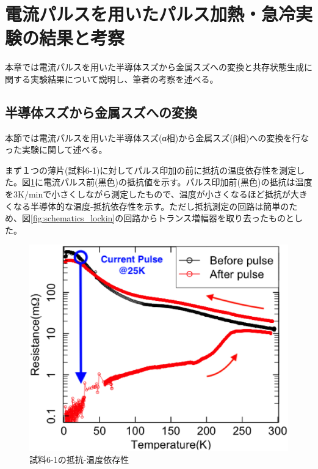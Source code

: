 \section{電流パルスを用いたパルス加熱・急冷実験の結果と考察}
本章では電流パルスを用いた半導体スズから金属スズへの変換と共存状態生成に関する実験結果について説明し、筆者の考察を述べる。

\subsection{半導体スズから金属スズへの変換}
本節では電流パルスを用いた半導体スズ(α相)から金属スズ(β相)への変換を行なった実験に関して述べる。

まず１つの薄片(試料6-1)に対してパルス印加の前に抵抗の温度依存性を測定した。図\ref{fig:181213_before_after_pulse_log}に電流パルス前(黒色)の抵抗値を示す。パルス印加前(黒色)の抵抗は温度を3K/minで小さくしながら測定したもので、温度が小さくなるほど抵抗が大きくなる半導体的な温度-抵抗依存性を示す。ただし抵抗測定の回路は簡単のため、図\ref{fig:schematics_lockin}の回路からトランス増幅器を取り去ったものとした。
\begin{figure}[!h]
    \begin{center}
   \includegraphics[width=0.7\hsize]{results_discussions/comparison2.eps}
  \end{center}
  \caption{試料6-1の抵抗-温度依存性}
  \label{fig:181213_before_after_pulse_log}
  \end{figure}
 
